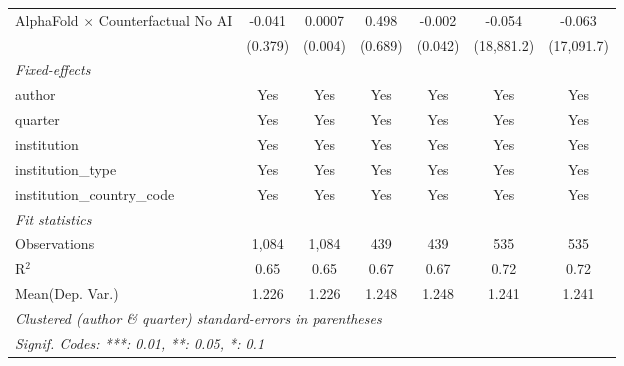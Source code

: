 \begin{tabular}{lcccccc}
   AlphaFold $\times$ Counterfactual No AI  & -0.041  & 0.0007  & 0.498     & -0.002    & -0.054     & -0.063\\   
                                            & (0.379) & (0.004) & (0.689)   & (0.042)   & (18,881.2) & (17,091.7)\\   
   \midrule
   \emph{Fixed-effects}\\
   author                                   & Yes     & Yes     & Yes       & Yes       & Yes        & Yes\\  
   quarter                                  & Yes     & Yes     & Yes       & Yes       & Yes        & Yes\\  
   institution                              & Yes     & Yes     & Yes       & Yes       & Yes        & Yes\\  
   institution\_type                        & Yes     & Yes     & Yes       & Yes       & Yes        & Yes\\  
   institution\_country\_code               & Yes     & Yes     & Yes       & Yes       & Yes        & Yes\\  
   \midrule
   \emph{Fit statistics}\\
   Observations                             & 1,084   & 1,084   & 439       & 439       & 535        & 535\\  
   R$^2$                                    & 0.65    & 0.65    & 0.67      & 0.67      & 0.72       & 0.72\\  
Mean(Dep. Var.) & 1.226 & 1.226 & 1.248 & 1.248 & 1.241 & 1.241 \\
   \midrule \midrule
   \multicolumn{7}{l}{\emph{Clustered (author \& quarter) standard-errors in parentheses}}\\
   \multicolumn{7}{l}{\emph{Signif. Codes: ***: 0.01, **: 0.05, *: 0.1}}\\
\end{tabular}
\par\endgroup

